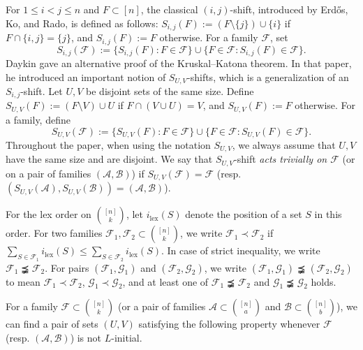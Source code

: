 \documentclass[11pt]{article}
\def\marrow{{\boldmath {\marginpar[\hfill$\rightarrow \rightarrow$]{$\leftarrow \leftarrow$}}}}
\def\andrey#1{{\sc Andrey: }{\marrow\sf \textcolor{blue}{#1}}}
\newcommand{\m}{\mathcal}
\def\yang#1{{\sc Yang: }{\marrow\sf \textcolor{cyan}{#1}}}
\begin{document}
For $1\le i <j \le n$ and $F\subset [n]$, the classical $(i,j)$-shift, introduced by Erd\H{o}s, Ko, and Rado, is defined as follows:
$S_{i,j}(F):=(F\setminus \{j\}) \cup \{i\}$ if $F\cap \{i,j\}=\{j\}$, and $S_{i,j}(F):=F$ otherwise. For a family $\m F$, set 
\[
S_{i,j}(\mathcal{F}) := \{ S_{i,j}(F) : F \in \mathcal{F} \} \cup \{ F \in \mathcal{F} : S_{i,j}(F) \in \mathcal{F} \}.
\]
Daykin \cite{Day1973} gave an alternative proof of the Kruskal--Katona theorem. In that paper, he introduced an important notion of $S_{U,V}$-shifts, which is a generalization of an $S_{i,j}$-shift. Let $U,V$ be disjoint sets of the same size. Define $S_{U,V}(F):=(F\setminus V) \cup U$ if $F\cap (V\cup U)=V$, and $S_{U,V}(F):=F$ otherwise. For a family, define 
\[
S_{U,V}(\mathcal{F}) := \{ S_{U,V}(F) : F \in \mathcal{F} \} \cup \{ F \in \mathcal{F} : S_{U,V}(F) \in \mathcal{F} \}.
\]
Throughout the paper, when using the notation $S_{U,V}$, we always assume that $U,V$ have the same size and are disjoint.
We say that $S_{U,V}$-shift {\it acts trivially on $\m F$} (or on a pair of families $(\m A, \m B)$) if $S_{U,V}(\m F)=\m F$ (resp. $(S_{U,V}(\m A), S_{U,V}(\m B))=(\m A, \m B)$).


For the lex order on $\binom{[n]}{k}$, let $i_{\text{lex}}(S)$ denote the position of a set $S$ in this order. For two families $\mathcal{F}_1, \mathcal{F}_2 \subset \binom{[n]}{k}$, we write 
$\mathcal{F}_1 \prec \mathcal{F}_2$ if 
$
\sum_{S \in \mathcal{F}_1} i_{\text{lex}}(S) \leq \sum_{S \in \mathcal{F}_2} i_{\text{lex}}(S).
$
In case of strict inequality, we write  $\mathcal{F}_1 \precneqq \mathcal{F}_2$.
For pairs $(\mathcal{F}_1, \mathcal{G}_1)$ and  $(\mathcal{F}_2, \mathcal{G}_2)$, we write $(\mathcal{F}_1, \mathcal{G}_1) \precneqq  (\mathcal{F}_2, \mathcal{G}_2)$ to mean $\mathcal{F}_1 \prec \mathcal{F}_2$, $\mathcal{G}_1 \prec \mathcal{G}_2$, and at least one of $\mathcal{F}_1 \precneqq \mathcal{F}_2$ and  $\mathcal{G}_1 \precneqq \mathcal{G}_2$ holds.

For a family $\m F\subset {[n]\choose k}$ (or a pair of families $\mathcal{A}\subset {[n]\choose a}$ and $\mathcal{B}\subset {[n]\choose b}$), 
we can find a pair of sets $(U,V)$ satisfying the following property whenever $\m F$ (resp. $(\mathcal{A},\mathcal{B})$) is not $L$-initial.
\end{document}
